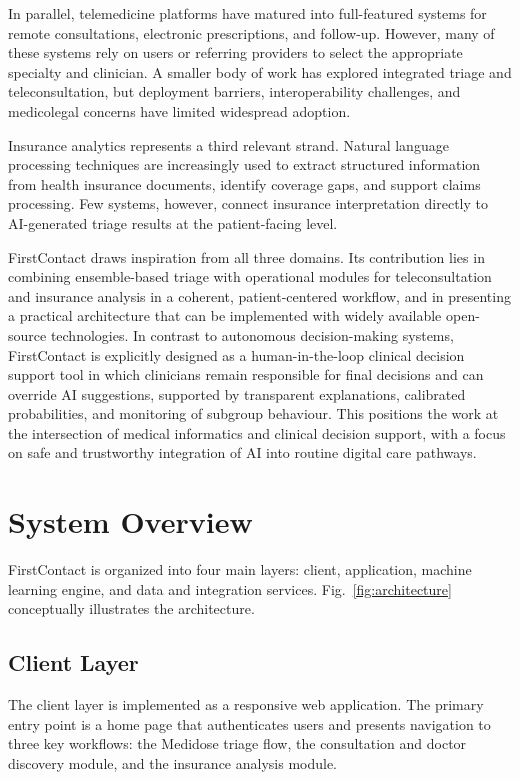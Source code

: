 \documentclass[conference]{IEEEtran}
\begin{document}
In parallel, telemedicine platforms have matured into full-featured systems for remote consultations, electronic prescriptions, and follow-up. However, many of these systems rely on users or referring providers to select the appropriate specialty and clinician. A smaller body of work has explored integrated triage and teleconsultation, but deployment barriers, interoperability challenges, and medicolegal concerns have limited widespread adoption.

Insurance analytics represents a third relevant strand. Natural language processing techniques are increasingly used to extract structured information from health insurance documents, identify coverage gaps, and support claims processing. Few systems, however, connect insurance interpretation directly to AI-generated triage results at the patient-facing level.

FirstContact draws inspiration from all three domains. Its contribution lies in combining ensemble-based triage with operational modules for teleconsultation and insurance analysis in a coherent, patient-centered workflow, and in presenting a practical architecture that can be implemented with widely available open-source technologies. In contrast to autonomous decision-making systems, FirstContact is explicitly designed as a human-in-the-loop clinical decision support tool in which clinicians remain responsible for final decisions and can override AI suggestions, supported by transparent explanations, calibrated probabilities, and monitoring of subgroup behaviour. This positions the work at the intersection of medical informatics and clinical decision support, with a focus on safe and trustworthy integration of AI into routine digital care pathways.

\section{System Overview}

FirstContact is organized into four main layers: client, application, machine learning engine, and data and integration services. Fig.~\ref{fig:architecture} conceptually illustrates the architecture.

\subsection{Client Layer}

The client layer is implemented as a responsive web application. The primary entry point is a home page that authenticates users and presents navigation to three key workflows: the Medidose triage flow, the consultation and doctor discovery module, and the insurance analysis module.
\end{document}
